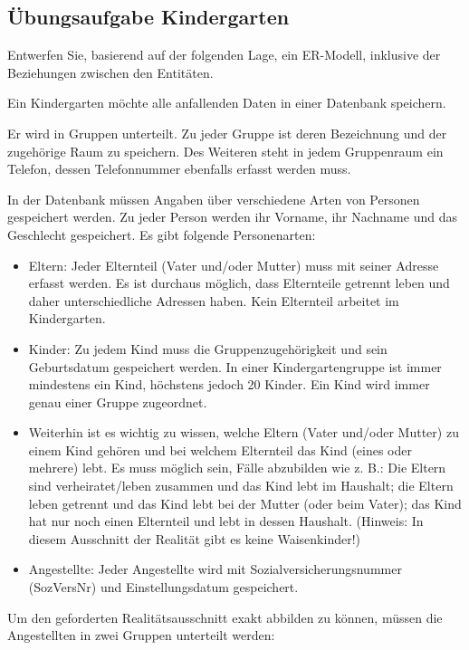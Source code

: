       \subsection{Übungsaufgabe Kindergarten}
        Entwerfen Sie, basierend auf der folgenden Lage, ein ER-Modell, inklusive der Beziehungen zwischen den Entit\"{a}ten.

        Ein Kindergarten möchte alle anfallenden Daten in einer Datenbank speichern.

        Er wird in Gruppen unterteilt. Zu jeder Gruppe ist deren Bezeichnung und der zugehörige Raum zu speichern. Des Weiteren steht in jedem Gruppenraum ein Telefon, dessen Telefonnummer ebenfalls erfasst werden muss.

        In der Datenbank müssen Angaben über verschiedene Arten von Personen gespeichert werden. Zu jeder Person werden ihr Vorname, ihr Nachname und das Geschlecht gespeichert. Es gibt folgende Personenarten:
        \begin{itemize}
          \item Eltern: Jeder Elternteil (Vater und/oder Mutter) muss mit seiner Adresse erfasst werden. Es ist durchaus möglich, dass Elternteile getrennt leben und daher unterschiedliche Adressen haben. Kein Elternteil arbeitet im Kindergarten.
          \item Kinder: Zu jedem Kind muss die Gruppenzugehörigkeit und sein Geburtsdatum gespeichert werden. In einer Kindergartengruppe ist immer mindestens ein Kind, höchstens jedoch 20 Kinder. Ein Kind wird immer genau einer Gruppe zugeordnet.
          \item Weiterhin ist es wichtig zu wissen, welche Eltern (Vater und/oder Mutter) zu einem Kind gehören und bei welchem Elternteil das Kind (eines oder mehrere) lebt. Es muss möglich sein, Fälle abzubilden wie z. B.: Die Eltern sind verheiratet/leben zusammen und das Kind lebt im Haushalt; die Eltern leben getrennt und das Kind lebt bei der Mutter (oder beim Vater); das Kind hat nur noch einen Elternteil und lebt in dessen Haushalt. (Hinweis: In diesem Ausschnitt der Realität gibt es keine Waisenkinder!)
          \item Angestellte: Jeder Angestellte wird mit Sozialversicherungsnummer (SozVersNr) und Einstellungsdatum gespeichert.
        \end{itemize}

        Um den geforderten Realitätsausschnitt exakt abbilden zu können,
        müssen die Angestellten in zwei Gruppen unterteilt werden:

